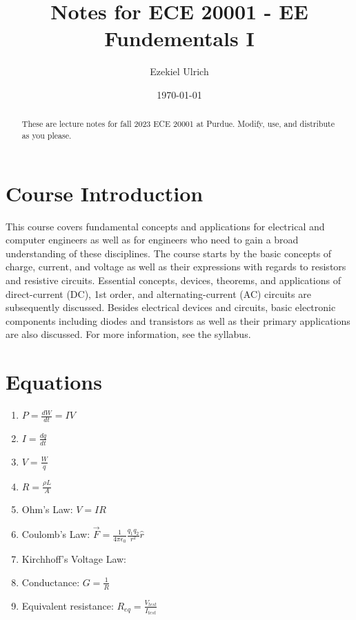 \documentclass[nobib]{tufte-handout}
\title{Notes for ECE 20001 - EE Fundementals I}
\author[Ezekiel Ulrich]{Ezekiel Ulrich}
\date{\today}  %
\begin{document}
\maketitle

\begin{abstract}
These are lecture notes for fall 2023 ECE 20001 at Purdue. Modify, use, and distribute as you please.
\end{abstract}

\tableofcontents

\section{Course Introduction}

This course covers fundamental concepts and applications 
for electrical and computer engineers as well as for engineers
 who need to gain a broad understanding of these disciplines. 
 The course starts by the basic concepts of charge, current, 
 and voltage as well as their expressions with regards to 
 resistors and resistive circuits. Essential concepts, 
 devices, theorems, and applications of direct-current (DC), 
 1st order, and alternating-current (AC) circuits are 
 subsequently discussed. Besides electrical devices and 
 circuits, basic electronic components including diodes and 
 transistors as well as their primary applications are also 
 discussed. For more information, see the syllabus. 

\section{Equations}

\begin{enumerate}
    \item $P = \frac{dW}{dt} = IV$
    \item $I = \frac{dq}{dt}$
    \item $V = \frac{W}{q}$
    \item $R = \frac{\rho L}{A}$
    \item Ohm's Law: $V=IR$
    \item Coulomb's Law: $\vec{F} = \frac{1}{4\pi \epsilon_0}\frac{q_1 q_2}{r^2}\hat{r}$
    \item Kirchhoff's Voltage Law: 
    \item Conductance: $G = \frac{1}{R}$
    \item Equivalent resistance: $R_{eq} = \frac{V_{test}}{I_{test}}$
\end{enumerate}
\end{document}

